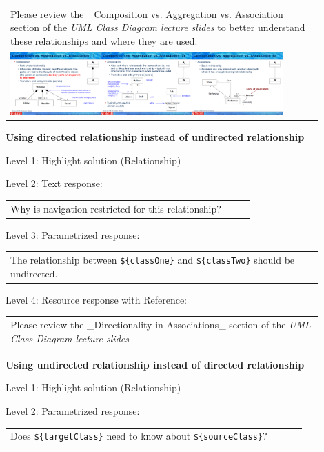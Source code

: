 \begin{tabular}{|p{0.9\linewidth}}
Please review the _Composition vs. Aggregation vs. Association_ section of 
the \textit{UML Class Diagram lecture slides} to 
better understand these relationships and where they are used.

\\
\includegraphics[width=0.9\textwidth]{images/composition_aggregation_association.png}
\end{tabular} \medskip


\noindent \textbf{Using directed relationship instead of undirected relationship} \medskip

\noindent Level 1: Highlight solution (Relationship) \medskip

\noindent Level 2: Text response: \medskip

\begin{tabular}{|p{0.9\linewidth}}
Why is navigation restricted for this relationship?
\end{tabular} \medskip

\noindent Level 3: Parametrized response: \medskip

\begin{tabular}{|p{0.9\linewidth}}
The relationship between \verb|${classOne}| and \verb|${classTwo}| should be undirected.
\end{tabular} \medskip

\noindent Level 4: Resource response with Reference: \medskip

\begin{tabular}{|p{0.9\linewidth}}
Please review the _Directionality in Associations_ section of the \textit{UML Class Diagram lecture slides}
\end{tabular} \medskip


\noindent \textbf{Using undirected relationship instead of directed relationship} \medskip

\noindent Level 1: Highlight solution (Relationship) \medskip

\noindent Level 2: Parametrized response: \medskip

\begin{tabular}{|p{0.9\linewidth}}
Does \verb|${targetClass}| need to know about \verb|${sourceClass}|?
\end{tabular} \medskip

